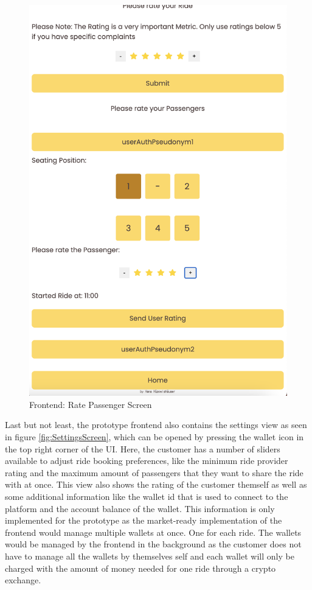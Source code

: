 \begin{figure}[H]
\begin{minipage}{0.45\linewidth}
        \includegraphics[width=\linewidth]{data/ffss/12.png}
        \caption{Frontend: Rate Passenger Screen}
        \label{fig:RatePassengerScreen}
    \end{minipage}
    
\end{figure}

Last but not least, the prototype frontend  also contains the settings view as seen in figure \ref{fig:SettingsScreen}, which can be opened by pressing the wallet icon in the top right corner of the UI. Here, the customer has a number of sliders available to adjust ride booking preferences, like the minimum ride provider rating and the maximum amount of passengers that they want to share the ride with at once. This view also shows the rating of the customer themself as well as some additional information like the wallet id that is used to connect to the platform and the account balance of the wallet. This information is only implemented for the prototype as the market-ready implementation of the frontend would manage multiple wallets at once. One for each ride. The wallets would be managed by the frontend in the background as the customer does not have to manage all the wallets by themselves self and each wallet will only be charged with the amount of money needed for one ride through a crypto exchange.

